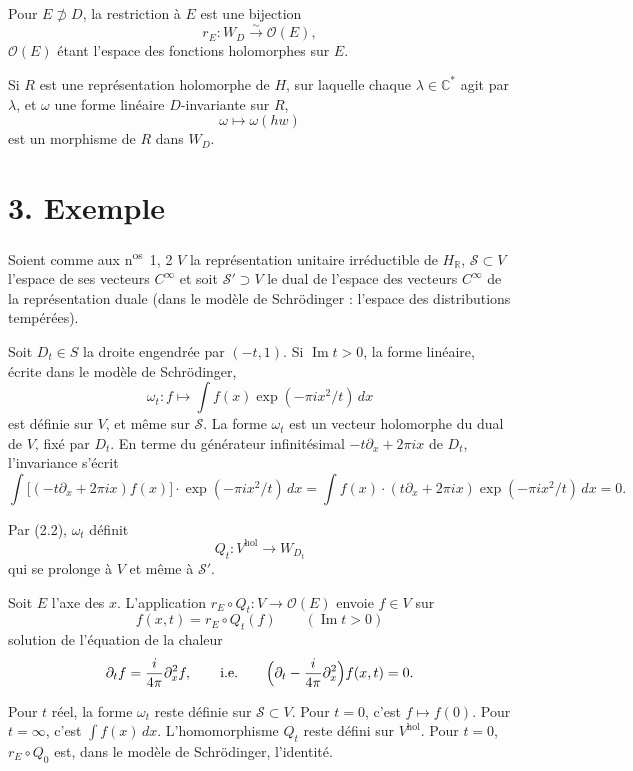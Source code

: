 \documentclass[12pt,a4paper]{article}
\theoremstyle{plain}
\theoremstyle{definition}
\theoremstyle{remark}
\DeclareMathOperator{\Impart}{Im}
\begin{document}
Pour $E \not\supset D$, la restriction à $E$ est une bijection
\begin{equation}\label{eq:2.1}
r_E \colon W_D \xrightarrow{\sim} \mathcal{O}(E),\tag{2.1}
\end{equation}
$\mathcal{O}(E)$ étant l'espace des fonctions holomorphes sur $E$.

Si $R$ est une représentation holomorphe de $H$, sur laquelle chaque $\lambda \in \mathbb{C}^*$ agit par $\lambda$, et $\omega$ une forme linéaire $D$-invariante sur $R$,
\begin{equation}\label{eq:2.2}
\omega \mapsto \omega(hw)\tag{2.2}
\end{equation}
est un morphisme de $R$ dans $W_D$.

\section*{3. Exemple}

Soient comme aux n\textsuperscript{os}~1, 2 $V$ la représentation unitaire irréductible de $H_\mathbb{R}$, $\mathcal{S} \subset V$ l'espace de ses vecteurs $C^\infty$ et soit $\mathcal{S}' \supset V$ le dual de l'espace des vecteurs $C^\infty$ de la représentation duale (dans le modèle de Schrödinger : l'espace des distributions tempérées).

Soit $D_t \in S$ la droite engendrée par $(-t, 1)$. Si $\Impart t > 0$, la forme linéaire, écrite dans le modèle de Schrödinger,
\[\omega_t \colon f \mapsto \int f(x)\exp(-\pi ix^2/t)\,dx\]
est définie sur $V$, et même sur $\mathcal{S}$. La forme $\omega_t$ est un vecteur holomorphe du dual de $V$, fixé par $D_t$. En terme du générateur infinitésimal $-t\partial_x + 2\pi ix$ de $D_t$, l'invariance s'écrit
\[\int \bigl[(-t\partial_x + 2\pi ix)f(x)\bigr] \cdot \exp(-\pi ix^2/t)\,dx = \int f(x) \cdot (t\partial_x + 2\pi ix)\exp(-\pi ix^2/t)\,dx = 0.\]

Par (2.2), $\omega_t$ définit
\[Q_t \colon V^{\mathrm{hol}} \to W_{D_t}\]
qui se prolonge à $V$ et même à $\mathcal{S}'$.

Soit $E$ l'axe des $x$. L'application $r_E \circ Q_t \colon V \to \mathcal{O}(E)$ envoie $f \in V$ sur
\[f(x, t) = r_E \circ Q_t(f) \qquad (\Impart t > 0)\]
solution de l'équation de la chaleur
\[\partial_t f = \frac{i}{4\pi}\partial_x^2 f, \qquad \text{i.e.} \qquad \Bigl(\partial_t - \frac{i}{4\pi}\partial_x^2\Bigr)f(x, t) = 0.\]

Pour $t$ réel, la forme $\omega_t$ reste définie sur $\mathcal{S} \subset V$. Pour $t = 0$, c'est $f \mapsto f(0)$. Pour $t = \infty$, c'est $\int f(x)\,dx$. L'homomorphisme $Q_t$ reste défini sur $V^{\mathrm{hol}}$. Pour $t = 0$, $r_E \circ Q_0$ est, dans le modèle de Schrödinger, l'identité.
\end{document}

